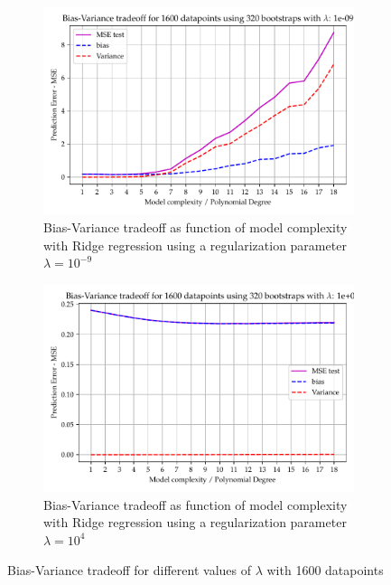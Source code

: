 \documentclass[11pt, a4paper]{article}
\begin{document}
\begin{figure}
  \centering
  \begin{subfigure}{0.49\textwidth}
      \centering
      \includegraphics[width=\textwidth]{figures/EX4_ridge_complexity_using_bootstrap_function_lmb400.pdf}
      \caption{\label{fig:ridge_beta_3}Bias-Variance tradeoff as function of model complexity with Ridge regression using a regularization parameter $\lambda = 10^{-9}$}
  \end{subfigure}
  \hfill
  \begin{subfigure}{0.49\textwidth}
      \centering
      \includegraphics[width=\textwidth]{figures/EX4_ridge_complexity_using_bootstrap_function_lmb4013.pdf}
      \caption{\label{fig:ridge_beta_4}Bias-Variance tradeoff as function of model complexity with Ridge regression using a regularization parameter $\lambda = 10^{4}$}
  \end{subfigure}
  \caption{\label{sfig:ridge_beta_2}Bias-Variance tradeoff for different values of $\lambda$ with 1600 datapoints}
\end{figure}
\end{document}
